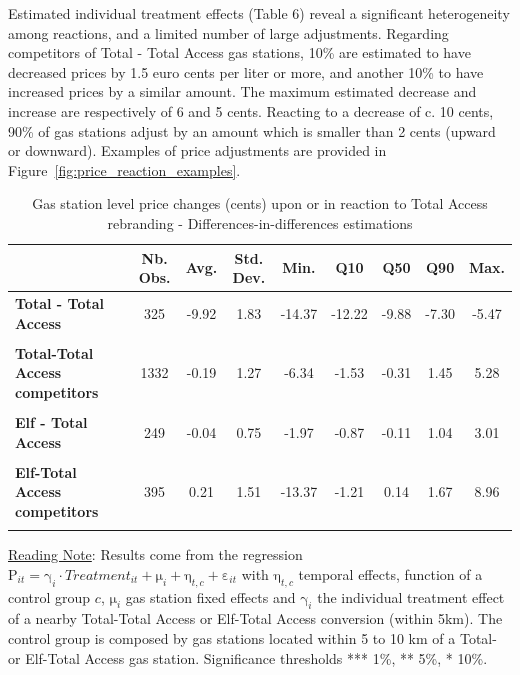 \documentclass[english]{article}
\begin{document}
Estimated individual treatment effects (Table 6) reveal a significant heterogeneity among reactions, and a limited number of large adjustments. Regarding competitors of Total - Total Access gas stations, 10\% are estimated to have decreased prices by 1.5 euro cents per liter or more, and another 10\% to have increased prices by a similar amount. The maximum estimated decrease and increase are respectively of 6 and 5 cents. Reacting to a decrease of c. 10 cents, 90\% of gas stations adjust by an amount which is smaller than 2 cents (upward or downward). Examples of price adjustments are provided in Figure~\ref{fig:price_reaction_examples}. \medskip{}

\newpage{}

\begin{table}[H]
\caption{Gas station level price changes (cents) upon or in reaction to Total Access rebranding - Differences-in-differences estimations}
\label{tab:gas_station_level_changes_dd_regs}
\begin{threeparttable}
\begin{scriptsize}
\begin{tabular}{llcccccccc}
\hline
\hline
 &  & \textbf{Nb. Obs.}  & \textbf{Avg.}  & \textbf{Std. Dev.}  & \textbf{Min.}  & \textbf{Q10}  & \textbf{Q50}  & \textbf{Q90}  & \textbf{Max.}\tabularnewline
\hline
\textbf{Total - Total Access}  &  & 325  & -9.92  & 1.83  & -14.37  & -12.22  & -9.88  & -7.30  & -5.47\tabularnewline
 &  &  &  &  &  &  &  &  & \tabularnewline
\textbf{Total-Total Access competitors}  &  & 1332  & -0.19  & 1.27  & -6.34  & -1.53  & -0.31  & 1.45  & 5.28\tabularnewline
 &  &  &  &  &  &  &  &  & \tabularnewline
\hline
\textbf{Elf - Total Access}  &  & 249  & -0.04  & 0.75  & -1.97  & -0.87  & -0.11  & 1.04  & 3.01\tabularnewline
 &  &  &  &  &  &  &  &  & \tabularnewline
\textbf{Elf-Total Access competitors}  &  & 395  & 0.21  & 1.51  & -13.37  & -1.21  & 0.14  & 1.67  & 8.96\tabularnewline
 &  &  &  &  &  &  &  &  & \tabularnewline
\hline
\hline
\end{tabular}
\end{scriptsize}
\end{threeparttable}
\end{table}

{\small{}\uline{Reading Note}}{\small{}:} Results come from the regression $\mathrm{P}_{it}=\mathrm{\gamma}_{i}\cdot Treatment_{it}+\mathrm{\mu}_{i}+\mathrm{\eta}_{t,c}+\mathrm{\varepsilon}_{it}$ with $\mathrm{\eta}_{t,c}$ temporal effects, function of a control group $c$, $\mathrm{\mu}_{i}$ gas station fixed effects and $\mathrm{\gamma}_{i}$ the individual treatment effect of a nearby Total-Total Access or Elf-Total Access conversion (within 5km). The control group is composed by gas stations located within 5 to 10 km of a Total- or Elf-Total Access gas station. Significance thresholds {*}{*}{*} 1\%, {*}{*} 5\%, {*} 10\%.\medskip{}
\end{document}

